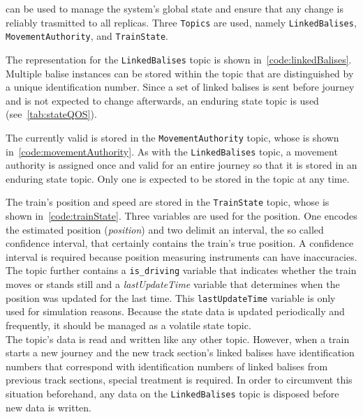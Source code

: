  can be used to manage the system's global state and ensure that any change is reliably trasmitted to all replicas.
Three \texttt{Topics} are used, namely \texttt{LinkedBalises}, \texttt{MovementAuthority}, and \texttt{TrainState}.

The  representation for the \texttt{LinkedBalises} topic is shown in~\autoref{code:linkedBalises}.
Multiple balise instances can be stored within the topic that are distinguished by a unique identification number.
Since a set of linked balises is sent before journey and is not expected to change afterwards, an enduring  state topic is used (see~\autoref{tab:stateQOS}).

The currently valid  is stored in the \texttt{MovementAuthority} topic, whose  is shown in~\autoref{code:movementAuthority}.
As with the \texttt{LinkedBalises} topic, a movement authority is assigned once and valid for an entire journey so that it is stored in an enduring state topic.
Only one  is expected to be stored in the topic at any time.

The train's position and speed are stored in the \texttt{TrainState} topic, whose  is shown in~\autoref{code:trainState}.
Three variables are used for the position.
One encodes the estimated position (\textit{position}) and two delimit an interval, the so called confidence interval, that certainly contains the train's true position.
A confidence interval is required because position measuring instruments can have inaccuracies.
The topic further contains a \texttt{is\_driving} variable that indicates whether the train moves or stands still and a \textit{lastUpdateTime} variable that determines when the position was updated for the last time.
This \texttt{lastUpdateTime} variable is only used for simulation reasons.
Because the state data is updated periodically and frequently, it should be managed as a volatile  state topic.
\\

The topic's data is read and written like any other  topic.
However, when a train starts a new journey and the new track section's linked balises have identification numbers that correspond with identification numbers of linked balises from previous track sections, special treatment is required.
In order to circumvent this situation beforehand, any data on the \texttt{LinkedBalises} topic is disposed before new data is written.

